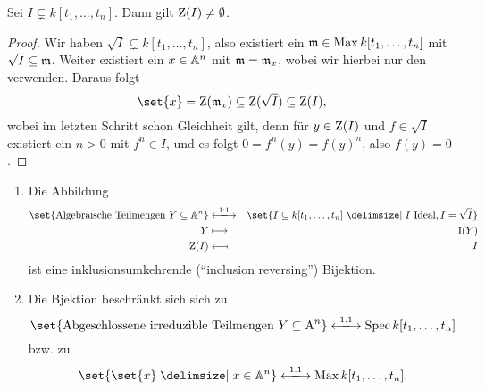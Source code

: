 \documentclass[12pt,a4paper]{scrartcl}
\theoremstyle{cplain}
\theoremstyle{cdef}
\begin{document}
\begin{bem}
	Sei $I\subsetneq k[t_1,\dots, t_n]$. Dann gilt $\operatorname{Z}(I)\neq \emptyset$.
	\begin{proof}
		Wir haben $\sqrt{I}\subsetneq k[t_1,\dots, t_n]$, also existiert ein $\mathfrak{m}\in\operatorname{Max} k[t_1,\dots, t_n]$ mit $\sqrt{I} \subseteq \mathfrak{m}$. Weiter existiert ein $x\in\mathbb A^n$ mit $\mathfrak{m} = \mathfrak{m}_x$, wobei wir hierbei nur den  verwenden.  Daraus folgt
		\[\set{x} = \Z(\fm_x) \subseteq \Z(\sqrt{I}) \subseteq \Z(I),\]
		wobei im letzten Schritt schon Gleichheit gilt, denn für $y\in \operatorname{Z}(I)$ und $f\in\sqrt {I}$ existiert ein $n>0$ mit $f^n\in I$, und es folgt $0 = f^n(y) = f(y)^n$, also $f(y) = 0$.
	\end{proof}
\end{bem}
\begin{kor} \label{kor:8.14}
	\leavevmode
	\begin{enumerate}
		\item \label{kor:8.14:i} Die Abbildung
		\begin{eqnarray*}
			\set{\text{Algebraische Teilmengen }Y\subseteq \IA^n}&\xlongleftrightarrow{1:1}&\set{I\subseteq k[t_1,\dots, t_n]\given I\text{ Ideal}, I = \sqrt{I}} \\
			Y &\longmapsto& \I(Y) \\
			\Z(I) &\longmapsfrom& I
		\end{eqnarray*}
		ist eine inklusionsumkehrende (\enquote{inclusion reversing}) Bijektion.
		\item \label{kor:8.14:ii} Die Bjektion beschränkt sich sich zu
		\[\set{\text{Abgeschlossene irreduzible Teilmengen }Y\subseteq \A^n}  \xlongleftrightarrow{1:1}\Spec k[t_1,\dots, t_n]\]
		bzw. zu 
		\[\set{\set{x}\given x\in\IA^n}\xlongleftrightarrow{1:1}\Max k[t_1,\dots, t_n].\]
	\end{enumerate}
\end{kor}
\end{document}
